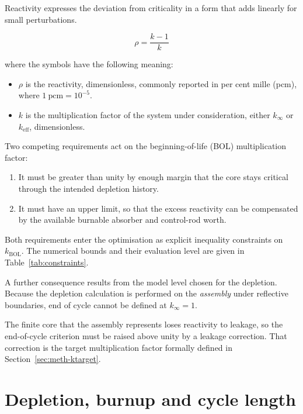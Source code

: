 Reactivity expresses the deviation from criticality in a form that adds
linearly for small perturbations.

\begin{equation}
\rho = \frac{k - 1}{k}
\label{eq:reactivity}
\end{equation}

\noindent where the symbols have the following meaning:

\begin{itemize}
  \item $\rho$ is the reactivity, dimensionless, commonly reported in
        per cent mille (pcm), where $1~\mathrm{pcm} = 10^{-5}$.

  \item $k$ is the multiplication factor of the system under
        consideration, either $k_\infty$ or $k_\mathrm{eff}$,
        dimensionless.
\end{itemize}

Two competing requirements act on the beginning-of-life (BOL)
multiplication factor:

\begin{enumerate}
  \item It must be greater than unity by enough margin that the core stays
        critical through the intended depletion history.

  \item It must have an upper limit, so that the excess reactivity can be compensated by the available burnable absorber and control-rod
        worth.
\end{enumerate}

Both requirements enter the optimisation as explicit inequality
constraints on $k_\mathrm{BOL}$. The numerical bounds and their
evaluation level are given in Table~\ref{tab:constraints}.

A further consequence results from the model level chosen for the
depletion. Because the depletion calculation is performed on the
\emph{assembly} under reflective boundaries, end of cycle cannot be
defined at $k_\infty = 1$.

The finite core that the assembly represents loses reactivity to
leakage, so the end-of-cycle criterion must be raised above unity by a
leakage correction. That correction is the target multiplication factor
formally defined in Section~\ref{sec:meth-ktarget}.

\section{Depletion, burnup and cycle length}
\label{sec:bg-depletion}

